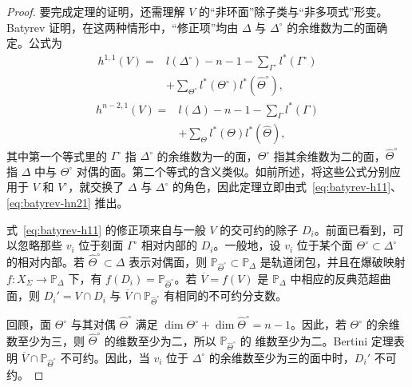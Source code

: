 \begin{proof}
要完成定理的证明，还需理解 $V$ 的“非环面”除子类与“非多项式”形变。Batyrev  证明，在这两种情形中，“修正项”均由 $\Delta$ 与 $\Delta^\circ$ 的余维数为二的面确定。公式为
\begin{equation}\label{eq:batyrev-h11}
\begin{aligned}
h^{1,1}(V)={}&l(\Delta^\circ)-n-1
-\sum_{\Gamma^\circ}l^*(\Gamma^\circ)\\
&+\sum_{\Theta^\circ}l^*(\Theta^\circ)l^*(\widehat\Theta^\circ),
\end{aligned}
\end{equation}
\begin{equation}\label{eq:batyrev-hn21}
\begin{aligned}
h^{n-2,1}(V)={}&l(\Delta)-n-1-\sum_\Gamma l^*(\Gamma)\\
&+\sum_\Theta l^*(\Theta)l^*(\widehat\Theta),
\end{aligned}
\end{equation}
其中第一个等式里的 $\Gamma^\circ$ 指 $\Delta^\circ$ 的余维数为一的面，$\Theta^\circ$ 指其余维数为二的面，$\widehat\Theta^\circ$ 指 $\Delta$ 中与 $\Theta^\circ$ 对偶的面。第二个等式的含义类似。如前所述，将这些公式分别应用于 $V$ 和 $V^\circ$，就交换了 $\Delta$ 与 $\Delta^\circ$ 的角色，因此定理立即由式~\eqref{eq:batyrev-h11}、\eqref{eq:batyrev-hn21} 推出。

式~\eqref{eq:batyrev-h11} 的修正项来自与一般 $V$ 的交可约的除子 $D_i$。前面已看到，可以忽略那些 $v_i$ 位于刻面 $\Gamma^\circ$ 相对内部的 $D_i$。一般地，设 $v_i$ 位于某个面 $\Theta^\circ\subset\Delta^\circ$ 的相对内部。若 $\widehat\Theta^\circ\subset\Delta$ 表示对偶面，则 $\mathbb P_{\widehat\Theta^\circ}\subset\mathbb P_\Delta$ 是轨道闭包，并且在爆破映射 $f:X_\Sigma\to\mathbb P_\Delta$ 下，有 $f(D_i)=\mathbb P_{\widehat\Theta^\circ}$。若 $\overline V=f(V)$ 是 $\mathbb P_\Delta$ 中相应的反典范超曲面，则 $D_i'=V\cap D_i$ 与 $\overline V\cap\mathbb P_{\widehat\Theta^\circ}$ 有相同的不可约分支数。

回顾，面 $\Theta^\circ$ 与其对偶 $\widehat\Theta^\circ$ 满足 $\dim\Theta^\circ+\dim\widehat\Theta^\circ=n-1$。因此，若 $\Theta^\circ$ 的余维数至少为三，则 $\widehat\Theta^\circ$ 的维数至少为二，所以 $\mathbb P_{\widehat\Theta^\circ}$ 的
维数至少为二。Bertini 定理表明 $\overline V\cap\mathbb P_{\widehat\Theta^\circ}$ 不可约。因此，当 $v_i$ 位于 $\Delta^\circ$ 的余维数至少为三的面中时，$D_i'$ 不可约。


\end{proof}
